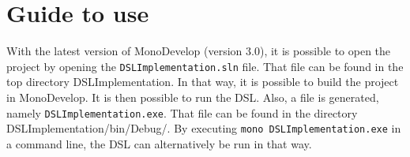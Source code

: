 \section{Guide to use}
With the latest version of MonoDevelop (version 3.0), it is possible to open the project by opening the \texttt{DSLImplementation.sln} file. That file can be found in the top directory DSLImplementation. In that way, it is possible to build the project in MonoDevelop. It is then possible to run the DSL. Also, a file is generated, namely \texttt{DSLImplementation.exe}. That file can be found in the directory DSLImplementation/bin/Debug/. By executing \texttt{mono DSLImplementation.exe} in a command line, the DSL can alternatively be run in that way.